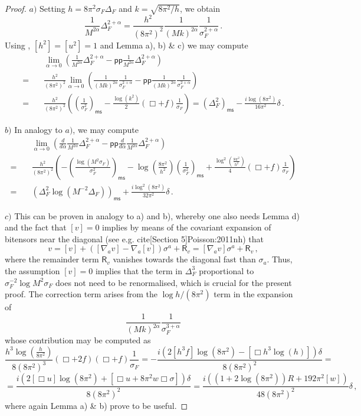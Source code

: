 \documentclass[10pt]{book}
\newcommand{\pp}{\mathsf{pp}}
\newcommand{\ms}{\mathsf{ms}}
\newcommand{\Rsf}{\mathsf{R}}
\theoremstyle{break}
\begin{document}
\begin{proof}
$a)$ Setting $h=8\pi^2\sigma_F \Delta_F$ and $k=\sqrt{8\pi^2/h}$, we obtain
%
$$\frac{1}{M^{2\alpha}}\Delta_F^{2+\alpha}=\frac{h^2}{(8\pi^2)^2}\frac{1}{(Mk)^{2\alpha}}\frac{1}{\sigma_F^{2+\alpha}}\,.$$ 
%
Using %
, $[h^2]=[u^2]=1$ and Lemma %
a), b) \& c) we may compute
%
\begin{align*}&\lim_{\alpha\to 0}\left(\frac{1}{M^{2\alpha}}\Delta_F^{2+\alpha}-\pp\frac{1}{M^{2\alpha}}\Delta_F^{2+\alpha}\right)\\
%
=\quad&\frac{h^2}{(8\pi^2)^2}\lim_{\alpha\to 0}\left(\frac{1}{(Mk)^{2\alpha}}\frac{1}{\sigma_F^{2+\alpha}}-\pp\frac{1}{(Mk)^{2\alpha}}\frac{1}{\sigma_F^{2+\alpha}}\right)\\
%
=\quad&\frac{h^2}{(8\pi^2)^2} \left(\left(\frac{1}{\sigma^2_F}\right)_\ms-\frac{\log (k^2)}{2}\left(\Box + f\right)\frac{1}{\sigma_F}\right)=(\Delta^2_F)_\ms-\frac{i\log(8\pi^2)}{16\pi^2}\delta\,.\end{align*}

$b)$ In analogy to $a)$, we may compute
%
\begin{align*}&\lim_{\alpha\to 0}\left(\frac{d}{d\alpha}\frac{1}{M^{2\alpha}}\Delta_F^{2+\alpha}-\pp\frac{d}{d\alpha}\frac{1}{M^{2\alpha}}\Delta_F^{2+\alpha}\right)\\
%
=\quad&\frac{h^2}{(8\pi^2)^2} \left(-\left(\frac{\log \left(M^2 \sigma_F\right)}{\sigma^2_F}\right)_\ms-\log\left(\frac{8\pi^2}{h^2}\right)\left(\frac{1}{\sigma^2_F}\right)_\ms+\frac{\log^2 \left(\frac{8\pi^2}{h^2}\right)}{4}\left(\Box + f\right)\frac{1}{\sigma_F}\right)\\
%
=\quad &\left(\Delta^2_F\log \left(M^{-2}\Delta_F\right)\right)_\ms+\frac{i\log^2(8\pi^2)}{32\pi^2}\delta\,.\end{align*}
 
$c)$ This can be proven in analogy to a) and b), whereby one also needs Lemma 
d) and the fact that $[v]=0$ implies by means of the covariant expansion of bitensors near the diagonal (see e.g. cite[Section 5]{Poisson:2011nh}) that 
$$v=[v]+([\nabla_a v]-\nabla_a[v])\sigma^a+\Rsf_v=[\nabla_a v]\sigma^a+\Rsf_v\,,$$
where the remainder term $\Rsf_v$ vanishes towards the diagonal fast than $\sigma_a$. Thus, the assumption $[v]=0$ implies that the term in $\Delta^3_F$ proportional to $\sigma^{-2}_F \log M^2\sigma_F$ does not need to be renormalised, which is crucial for the present proof. The correction term arises from the  $\log h/(8\pi^2)$ term in the expansion of $$\frac{1}{(Mk)^{2\alpha}}\frac{1}{\sigma_F^{3+\alpha}}$$ whose contribution may be computed as
%
$$\frac{h^3 \log\left( \frac{h}{8\pi^2}\right)}{8(8\pi^2)^3}(\Box+2f)(\Box+f)\frac{1}{\sigma_F}=-\frac{i\left(2[h^3 f]\log(8\pi^2)-[\Box h^3 \log (h)]\right)\delta}{8(8\pi^2)^2}=$$
%
$$=\frac{i\left(2[\Box u]\log(8\pi^2)+[\Box u + 8\pi^2 w\Box \sigma]\right)\delta}{8(8\pi^2)^2}=\frac{i\left((1+2\log(8\pi^2))R+192\pi^2[w]\right)}{48(8\pi^2)^2}\delta\,,$$
%
where again Lemma %
a) \& b) prove to be  useful.
\end{proof}
\end{document}
